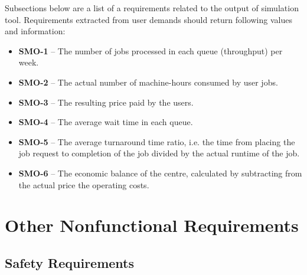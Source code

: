 \documentclass{report}
\begin{document}
Subsections below are a list of a requirements related to the output of simulation tool.
Requirements extracted from user demands should return following values and information:
\begin{itemize}
	\item
	{
		\textbf{SMO-1} -- The number of jobs processed in each queue (throughput) per week.
	}
	\item
	{
		\textbf{SMO-2} -- The actual number of machine-hours consumed by user jobs.
	}
	\item
	{
		\textbf{SMO-3} -- The resulting price paid by the users.
	}
	\item
	{
		\textbf{SMO-4} -- The average wait time in each queue.
	}
	\item
	{
		\textbf{SMO-5} -- The average turnaround time ratio, i.e. the time from placing the job request to completion of the job divided by the actual runtime of the job.
	}
	\item
	{
		\textbf{SMO-6} -- The economic balance of the centre, calculated by subtracting from the actual price the operating costs.
	}

\end{itemize}

\chapter{Other Nonfunctional Requirements}


\section{Safety Requirements}
\end{document}
